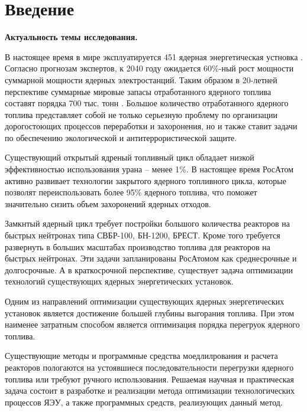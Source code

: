 \chapter*{Введение}							%

\textbf{Актуальность темы исследования.}

В настоящее время в мире эксплуатируется 451 ядерная энергетическая устновка \cite{iaea}.
Согласно прогнозам экспертов, к 2040 году ожидается  60\%-ный рост мощности суммарной мощности ядерных электростанций.
Таким образом в 20-летней перспективе суммарные мировые запасы отработанного ядерного топлива составят порядка 700 тыс. тонн \cite{tends-2015}.
Большое количество отработанного ядерного топлива представляет собой не только серьезную проблему по организации дорогостоющих процессов переработки и захоронения, но и также ставит задачи по обеспечению экологической и антитеррористической защите.

Существующий открытый ядреный топливный цикл обладает низкой эффективностью использования урана -- менее 1\%.
В настоящее время РосАтом активно развивает технологии закрытого ядерного топливного цикла, которые позволят переиспользовать более 95\% ядерного топлива, что поможет значительно снзить объем захоронений ядерных отходов.
\cite{cycle}

Замкнтый ядерный цикл требует постройки большого количества реакторов на быстрых нейтронах типа СВБР-100, БН-1200, БРЕСТ. Кроме того требуется развернуть в больших масштабах производство топлива для реакторов на быстрых нейтронах. Эти задачи запланированы РосАтомом как среднесрочные и долгосрочные. 
А в краткосрочной перспективе, существует задача оптимизации технологий существующих ядерных энергетических установок.\cite{cycle}

Одним из направлений оптимизации существующих ядерных энергетических установок является достижение большей глубины выгорания топлива.
При этом наименее затратным способом является оптимизация порядка перегруок ядерного топлива.

Существующие методы и программные средства моедлилрования и расчета реакторов пологаются на устоявшиеся последовательности перегрузки ядерного топлива или требуют ручного использования.
Решаемая научная и практическая задача состоит в разработке и реализации метода оптимизации технологических процессов ЯЭУ, а также программных средств, реализующих данный метод.




